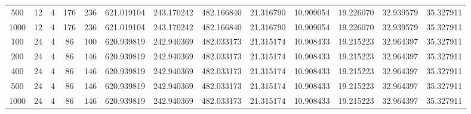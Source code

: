 \begin{table}[h]
\begin{tabular}{ccccccccccccc}
500 & 12 & 4 & 176 & 236 & 621.019104 & 243.170242 & 482.166840 & 21.316790 & 10.909054 & 19.226070 & 32.939579 & 35.327911 \\
1000 & 12 & 4 & 176 & 236 & 621.019104 & 243.170242 & 482.166840 & 21.316790 & 10.909054 & 19.226070 & 32.939579 & 35.327911 \\
100 & 24 & 4 & 86 & 100 & 620.939819 & 242.940369 & 482.033173 & 21.315174 & 10.908433 & 19.215223 & 32.964397 & 35.327911 \\
200 & 24 & 4 & 86 & 146 & 620.939819 & 242.940369 & 482.033173 & 21.315174 & 10.908433 & 19.215223 & 32.964397 & 35.327911 \\
400 & 24 & 4 & 86 & 146 & 620.939819 & 242.940369 & 482.033173 & 21.315174 & 10.908433 & 19.215223 & 32.964397 & 35.327911 \\
500 & 24 & 4 & 86 & 146 & 620.939819 & 242.940369 & 482.033173 & 21.315174 & 10.908433 & 19.215223 & 32.964397 & 35.327911 \\
1000 & 24 & 4 & 86 & 146 & 620.939819 & 242.940369 & 482.033173 & 21.315174 & 10.908433 & 19.215223 & 32.964397 & 35.327911 \\
\bottomrule
\end{tabular}
\end{table}
